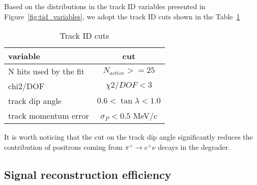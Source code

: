 Based on the distributions in the track ID variables presented in Figure~\ref{fig:tid_variables},
we adopt the track ID cuts shown in the Table~\ref{table:track_id_cuts}
\begin{table}[H]
  \centering
  \begin{tabularx} {0.5\textwidth}{|X|c|}  %
    \hline
    variable                &   cut                        \\
    \hline                         
    N hits used by the fit &   $N_{active}>= 25$            \\
    \hline                         
    chi2/DOF             &   $\chi2/DOF < 3$            \\
    \hline                         
    track dip angle     &   $0.6 < \tan \lambda < 1.0$ \\
    \hline                         
    track momentum error    &   $\sigma_P < 0.5$ MeV/c     \\
    \hline
  \end{tabularx}
  \caption{
    \label{table:track_id_cuts}
    Track ID cuts
  }
\end{table}

It is worth noticing that the cut on the track dip angle significantly reduces
the contribution of positrons coming from $\pi^+ \to e^+ \nu$ decays in the degrader.

\subsection{Signal reconstruction efficiency}


